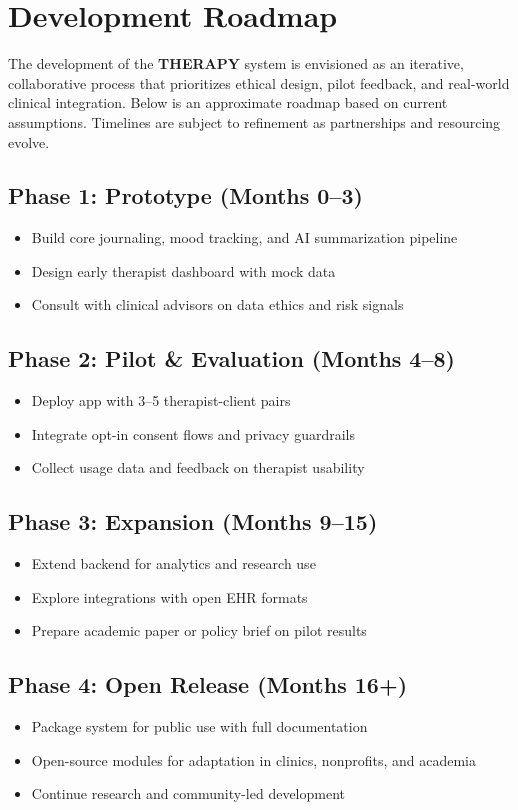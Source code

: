 \section*{Development Roadmap}

The development of the \textbf{THERAPY} system is envisioned as an iterative, collaborative process that prioritizes ethical design, pilot feedback, and real-world clinical integration. Below is an approximate roadmap based on current assumptions. Timelines are subject to refinement as partnerships and resourcing evolve.

\subsection*{Phase 1: Prototype (Months 0–3)}
\begin{itemize}
  \item Build core journaling, mood tracking, and AI summarization pipeline
  \item Design early therapist dashboard with mock data
  \item Consult with clinical advisors on data ethics and risk signals
\end{itemize}

\subsection*{Phase 2: Pilot \& Evaluation (Months 4–8)}
\begin{itemize}
  \item Deploy app with 3–5 therapist-client pairs
  \item Integrate opt-in consent flows and privacy guardrails
  \item Collect usage data and feedback on therapist usability
\end{itemize}

\subsection*{Phase 3: Expansion (Months 9–15)}
\begin{itemize}
  \item Extend backend for analytics and research use
  \item Explore integrations with open EHR formats
  \item Prepare academic paper or policy brief on pilot results
\end{itemize}

\subsection*{Phase 4: Open Release (Months 16+)}
\begin{itemize}
  \item Package system for public use with full documentation
  \item Open-source modules for adaptation in clinics, nonprofits, and academia
  \item Continue research and community-led development
\end{itemize}

